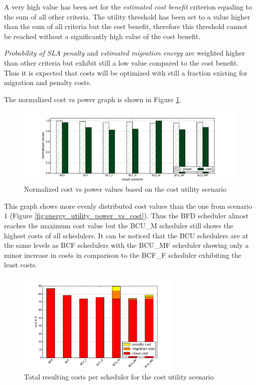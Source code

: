 A very high value has been set for the \textit{estimated cost benefit} criterion equaling to the sum of all other criteria. The utility threshold has been set to a value higher than the sum of all criteria but the cost benefit, therefore this threshold cannot be reached without a significantly high value of the cost benefit. 

\textit{Probability of SLA penalty} and \textit{estimated migration energy} are weighted higher than other criteria but exhibit still a low value compared to the cost benefit. Thus it is expected that costs will be optimized with still a fraction existing for migration and penalty costs. 

The normalized cost vs power graph is shown in Figure \ref{fig:cost_utility_power_vs_cost}. 

\begin{figure}[htbp]
	\centering
		\includegraphics[width=1.00\textwidth]{figures/evaluation_and_results/cost_utility_power_vs_cost.pdf}
	\caption{Normalized cost vs power values based on the cost utility scenario}
	\label{fig:cost_utility_power_vs_cost}
\end{figure}

This graph shows more evenly distributed cost values than the one from scenario 1 (Figure \ref{fig:energy_utility_power_vs_cost}). Thus the BFD scheduler almost reaches the maximum cost value but the BCU\_M scheduler still shows the highest costs of all schedulers. It can be noticed that the BCU schedulers are at the same levels as BCF schedulers with the BCU\_MF scheduler showing only a minor increase in costs in comparison to the BCF\_F scheduler exhibiting the least costs. 

\begin{figure}[bp]
	\centering
		\includegraphics[width=0.7\textwidth]{figures/evaluation_and_results/cost_utility_total_cost.pdf}
	\caption{Total resulting costs per scheduler for the cost utility scenario}
	\label{fig:cost_utility_total_cost}
\end{figure}


